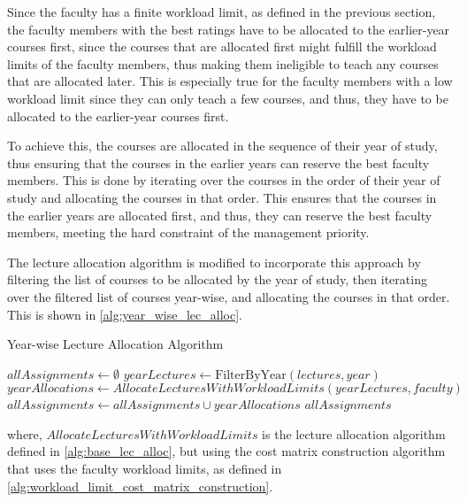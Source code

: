Since the faculty has a finite workload limit, as defined in the previous section, the faculty members with the best ratings have to be allocated to the earlier-year courses first, since the courses that are allocated first might fulfill the workload limits of the faculty members, thus making them ineligible to teach any courses that are allocated later. This is especially true for the faculty members with a low workload limit since they can only teach a few courses, and thus, they have to be allocated to the earlier-year courses first.

To achieve this, the courses are allocated in the sequence of their year of study, thus ensuring that the courses in the earlier years can reserve the best faculty members. This is done by iterating over the courses in the order of their year of study and allocating the courses in that order. This ensures that the courses in the earlier years are allocated first, and thus, they can reserve the best faculty members, meeting the hard constraint of the management priority.

The lecture allocation algorithm is modified to incorporate this approach by filtering the list of courses to be allocated by the year of study, then iterating over the filtered list of courses year-wise, and allocating the courses in that order. This is shown in \autoref{alg:year_wise_lec_alloc}.

\begin{algorithm}[H]
  \caption{Year-wise Lecture Allocation Algorithm}
  \begin{algorithmic}[1]
    \State $allAssignments \gets \emptyset$
     
    \State $yearLectures \gets \text{FilterByYear}(lectures, year)$
    \State $yearAllocations \gets AllocateLecturesWithWorkloadLimits(yearLectures, faculty)$
    \State $allAssignments \gets allAssignments \cup yearAllocations$
    \EndFor
    \State \Return $allAssignments$
    \EndProcedure
  \end{algorithmic}
  \label{alg:year_wise_lec_alloc}
\end{algorithm}

where, $AllocateLecturesWithWorkloadLimits$ is the lecture allocation algorithm defined in \autoref{alg:base_lec_alloc}, but using the cost matrix construction algorithm that uses the faculty workload limits, as defined in \autoref{alg:workload_limit_cost_matrix_construction}.

